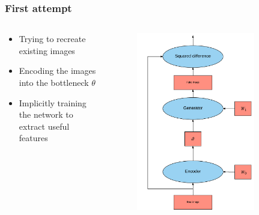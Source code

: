 \documentclass{Bredelebeamer}
\begin{document}
\begin{frame}
\frametitle{First attempt}
\begin{columns}
\begin{column}{0.5\textwidth}
\begin{itemize}
	\item Trying to recreate existing images
	\item Encoding the images into the bottleneck $\theta$
	\item Implicitly training the network to extract useful features
\end{itemize}
\end{column}
\begin{column}{0.5\textwidth}  %
\begin{figure}[h!]
	\centering
	\includegraphics[width=0.8\textwidth]{autoencoder_attempt.png}
\end{figure}
\end{column}
\end{columns}

\end{frame}
\end{document}
